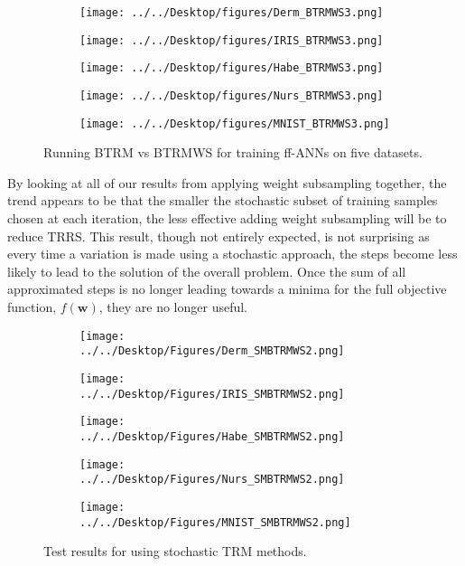 \documentclass[letterpaper,12pt,titlepage,oneside,final]{book}
\begin{document}
	\begin{figure}
		\centering
		\begin{subfigure}{.45\textwidth}
			\texttt{[image: ../../Desktop/figures/Derm\_BTRMWS3.png]}
		\end{subfigure}
		\begin{subfigure}{.45\textwidth}
			\texttt{[image: ../../Desktop/figures/IRIS\_BTRMWS3.png]}
		\end{subfigure}
		\begin{subfigure}{.45\textwidth}
			\texttt{[image: ../../Desktop/figures/Habe\_BTRMWS3.png]}
		\end{subfigure}
		\begin{subfigure}{.45\textwidth}
			\texttt{[image: ../../Desktop/figures/Nurs\_BTRMWS3.png]}
		\end{subfigure}
		\begin{subfigure}{.45\textwidth}
			\texttt{[image: ../../Desktop/figures/MNIST\_BTRMWS3.png]}
		\end{subfigure}
		\caption{Running BTRM vs BTRMWS for training ff-ANNs on five datasets.}
		\label{figure:BTRMWS}
	\end{figure}
	

	
	By looking at all of our results from applying weight subsampling together, the trend appears to be that the smaller the stochastic subset of training samples chosen at each iteration, the less effective adding weight subsampling will be to reduce TRRS. This result, though not entirely expected, is not surprising as every time a variation is made using a stochastic approach, the steps become less likely to lead to the solution of the overall problem. Once the sum of all approximated steps is no longer leading towards a minima for the full objective function, $f(\mathbf{w})$, they are no longer useful.
	
	\begin{figure}
		\centering
		\begin{subfigure}{.45\textwidth}
			\texttt{[image: ../../Desktop/Figures/Derm\_SMBTRMWS2.png]}
		\end{subfigure}
		\begin{subfigure}{.45\textwidth}
			\texttt{[image: ../../Desktop/Figures/IRIS\_SMBTRMWS2.png]}
		\end{subfigure}
		\begin{subfigure}{.45\textwidth}
			\texttt{[image: ../../Desktop/Figures/Habe\_SMBTRMWS2.png]}
		\end{subfigure}
		\begin{subfigure}{.45\textwidth}
			\texttt{[image: ../../Desktop/Figures/Nurs\_SMBTRMWS2.png]}
		\end{subfigure}
		\begin{subfigure}{.45\textwidth}
			\texttt{[image: ../../Desktop/Figures/MNIST\_SMBTRMWS2.png]}
		\end{subfigure}
		\caption{Test results for using stochastic TRM methods.}
		\label{figure:SMBTRMWS}
	\end{figure}
	
\end{document}
